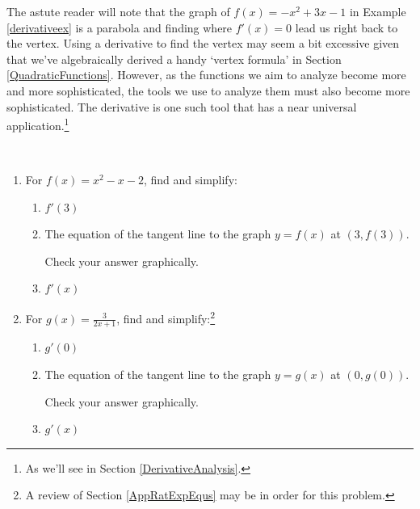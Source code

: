 \documentclass{ximera}
\begin{document}
The astute reader will note that the graph of $f(x) = -x^2+3x-1$ in Example \ref{derivativeex} is a parabola and finding where $f'(x) = 0$ lead us right back to the vertex.  Using a derivative to find the vertex may seem a bit excessive given that we've algebraically derived a handy `vertex formula' in Section \ref{QuadraticFunctions}.   However, as the functions we aim to analyze become more and more sophisticated, the tools we use to analyze them must also become more sophisticated.  The derivative is one such tool that has a near universal application.\footnote{As we'll see in Section \ref{DerivativeAnalysis}.}

\begin{example}  \label{morederivativesex} $~$

\begin{enumerate}

\item  For $f(x) = x^2-x-2$, find and simplify:   

\begin{enumerate}

\item  $f'(3)$ %

\item  The equation of the tangent line to the graph $y = f(x)$ at $(3, f(3))$.  

Check your answer graphically.

\item  $f'(x)$ %

\end{enumerate}

\item  For $g(x) =  \frac{3}{2x+1}$, find and simplify:\footnote{A review of Section \ref{AppRatExpEqus} may be in order for this problem.}

\begin{enumerate}

\item  $g'(0)$ %

\item  The equation of the tangent line to the graph $y = g(x)$ at $(0, g(0))$.  

Check your answer graphically.
 
\item  $g'(x)$ %

\end{enumerate}


\end{enumerate}
\end{example}
\end{document}
